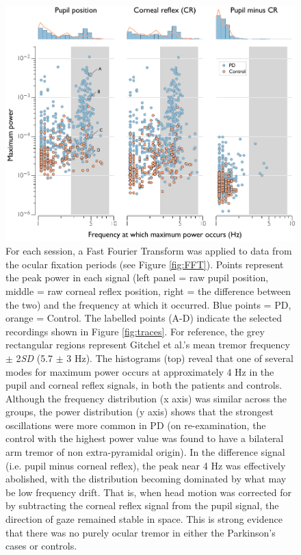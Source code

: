 \documentclass[jou,a4paper]{apa6}
\begin{document}
\begin{figure}[htbp]
\begin{center}
\includegraphics {Figures/Figure_4_Main_frequency_data}
\caption{For each session, a Fast Fourier Transform was applied to data from the ocular fixation periods (see Figure \ref{fig:FFT}). Points represent the peak power in each signal (left panel = raw pupil position, middle = raw corneal reflex position, right = the difference between the two) and the frequency at which it occurred. Blue points = PD, orange = Control. The labelled points (A-D) indicate the selected recordings shown in Figure \ref{fig:traces}. For reference, the grey rectangular regions represent Gitchel et al.'s mean tremor frequency $\pm$ 2\textit{SD} (5.7 $\pm$ 3 Hz). The histograms (top) reveal that one of several modes for maximum power occurs at approximately 4 Hz in the pupil and corneal reflex signals, in both the patients and controls. Although the frequency distribution (x axis) was similar across the groups, the power distribution (y axis) shows that the strongest oscillations were more common in PD (on re-examination, the control with the highest power value was found to have a bilateral arm tremor of non extra-pyramidal origin). In the difference signal (i.e. pupil minus corneal reflex), the peak near 4 Hz was effectively abolished, with the distribution becoming dominated by what may be low frequency drift. That is, when head motion was corrected for by subtracting the corneal reflex signal from the pupil signal, the direction of gaze remained stable in space. This is strong evidence that there was no purely ocular tremor in either the Parkinson's cases or controls.}
\label{fig:main}
\end{center}
\end{figure}
\end{document}
